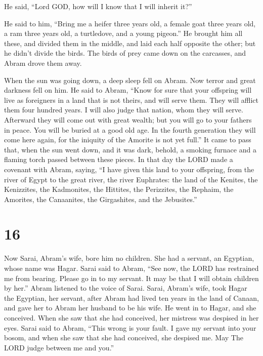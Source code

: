  He said, ``Lord GOD, how will I know that I will inherit
it?''

 He said to him, ``Bring me a heifer three years old, a
female goat three years old, a ram three years old, a turtledove, and a
young pigeon.''  He brought him all these, and divided
them in the middle, and laid each half opposite the other; but he didn't
divide the birds.  The birds of prey came down on the
carcasses, and Abram drove them away.

 When the sun was going down, a deep sleep fell on Abram.
Now terror and great darkness fell on him.  He said to
Abram, ``Know for sure that your offspring will live as foreigners in a
land that is not theirs, and will serve them. They will afflict them
four hundred years.  I will also judge that nation, whom
they will serve. Afterward they will come out with great wealth;
 but you will go to your fathers in peace. You will be
buried at a good old age.  In the fourth generation they
will come here again, for the iniquity of the Amorite is not yet full.''
 It came to pass that, when the sun went down, and it was
dark, behold, a smoking furnace and a flaming torch passed between these
pieces.  In that day the LORD made a covenant with Abram,
saying, ``I have given this land to your offspring, from the river of
Egypt to the great river, the river Euphrates:  the land
of the Kenites, the Kenizzites, the Kadmonites,  the
Hittites, the Perizzites, the Rephaim,  the Amorites, the
Canaanites, the Girgashites, and the Jebusites.''

\hypertarget{section-15}{%
\section{16}\label{section-15}}

 Now Sarai, Abram's wife, bore him no children. She had a
servant, an Egyptian, whose name was Hagar.  Sarai said to
Abram, ``See now, the LORD has restrained me from bearing. Please go in
to my servant. It may be that I will obtain children by her.'' Abram
listened to the voice of Sarai.  Sarai, Abram's wife, took
Hagar the Egyptian, her servant, after Abram had lived ten years in the
land of Canaan, and gave her to Abram her husband to be his wife.
 He went in to Hagar, and she conceived. When she saw that
she had conceived, her mistress was despised in her eyes. 
Sarai said to Abram, ``This wrong is your fault. I gave my servant into
your bosom, and when she saw that she had conceived, she despised me.
May The LORD judge between me and you.''

